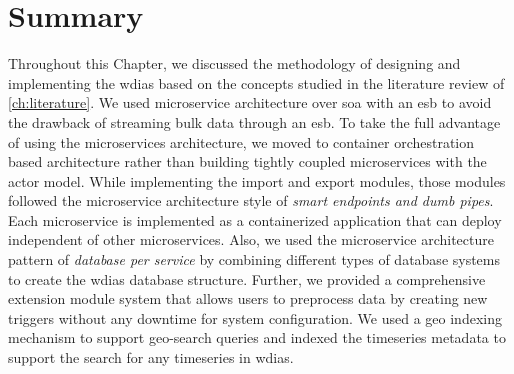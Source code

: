 \section{Summary}
\label{se:method_summary}

Throughout this Chapter, we discussed the methodology of designing and implementing the \acrshort{wdias} based on the concepts studied in the literature review of \cref{ch:literature}. We used microservice architecture over \acrshort{soa} with an \acrshort{esb} to avoid the drawback of streaming bulk data through an \acrshort{esb}. To take the full advantage of using the microservices architecture, we moved to container orchestration based architecture rather than building tightly coupled microservices with the actor model. 
While implementing the import and export modules, those modules followed the microservice architecture style of \emph{smart endpoints and dumb pipes}. Each microservice is implemented as a containerized application that can deploy independent of other microservices. Also, we used the microservice architecture pattern of \emph{database per service} by combining different types of database systems to create the \acrshort{wdias} database structure. Further, we provided a comprehensive extension module system that allows users to preprocess data by creating new triggers without any downtime for system configuration. We used a geo indexing mechanism to support geo-search queries and indexed the timeseries metadata to support the search for any timeseries in \acrshort{wdias}.
